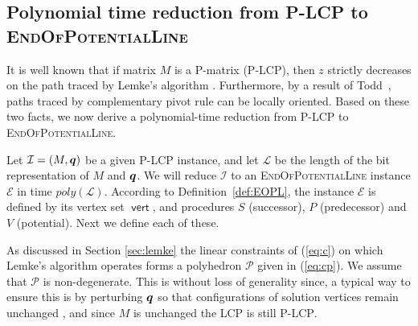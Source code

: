 \documentclass[a4paper,UKenglish]{lipics2}
\theoremstyle{definition}
\def\problem#1{\textsc{#1}}
\def\EOPL{\problem{EndOfPotentialLine}\xspace}
\def\PLCP{\problem{P-LCP}\xspace}
\def\pot{\mbox{$V$}}
\def\vert{\operatorname{\mathsf{vert}}}
\newcommand{\CPol}{\mbox{${\mathcal P}$}}
\newcommand{\CI}{\mbox{${\mathcal I}$}}
\newcommand{\CL}{\mbox{${\mathcal L}$}}
\newcommand{\CE}{\mbox{${\mathcal E}$}}
\newcommand{\qq}{\mbox{\boldmath $q$}}
\begin{document}

\subsection{Polynomial time reduction from \PLCP to \EOPL}

It is well known that if matrix $M$ is a P-matrix (\PLCP), then $z$ strictly
decreases on the path traced by Lemke's algorithm \cite{cottle2009linear}.
Furthermore, by a result of Todd~\cite[Section 5]{todd1976orientation}, paths traced by
complementary pivot rule can be locally oriented.  Based on these two facts, 
we now derive a polynomial-time reduction from \PLCP to \EOPL.

Let $\CI=(M,\qq)$ be a given \PLCP instance, and let $\CL$ be the length of the 
bit representation of $M$ and $\qq$. 
We will reduce $\CI$ to an \EOPL instance $\CE$ in time $poly(\CL)$. 
According to Definition~\ref{def:EOPL}, the instance $\CE$ is defined 
by its vertex set $\vert$, and procedures $S$ (successor), $P$ (predecessor) and $\pot$ (potential). 
Next we define each of these. 

As discussed in Section \ref{sec:lemke} the linear constraints of (\ref{eq:c})
on which Lemke's algorithm operates forms a polyhedron $\CPol$ given in
(\ref{eq:cp}). We assume that $\CPol$ is non-degenerate. This is without
loss of generality since, a typical way to ensure this is by perturbing $\qq$ so
that configurations of solution vertices remain unchanged
\cite{cottle2009linear}, and since $M$ is unchanged the LCP is still \PLCP. 
\end{document}
